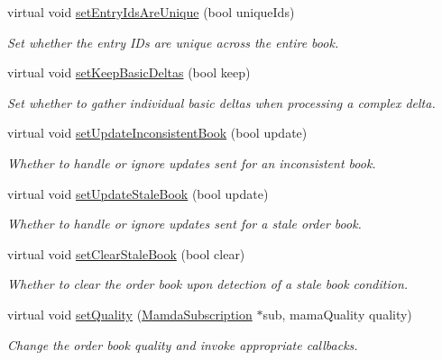 \begin{CompactItemize}
virtual void \hyperlink{classWombat_1_1MamdaOrderBookListener_4c08ce3aefa0cddb9980a7a8cf043545}{set\-Entry\-Ids\-Are\-Unique} (bool unique\-Ids)
\begin{CompactList}\small\item\em Set whether the entry IDs are unique across the entire book. \item\end{CompactList}\item 
virtual void \hyperlink{classWombat_1_1MamdaOrderBookListener_393f4acf6e9f87dc8c1de480398d2c6e}{set\-Keep\-Basic\-Deltas} (bool keep)
\begin{CompactList}\small\item\em Set whether to gather individual basic deltas when processing a complex delta. \item\end{CompactList}\item 
virtual void \hyperlink{classWombat_1_1MamdaOrderBookListener_8d9563f0639d57630d786a614da5ad60}{set\-Update\-Inconsistent\-Book} (bool update)
\begin{CompactList}\small\item\em Whether to handle or ignore updates sent for an inconsistent book. \item\end{CompactList}\item 
virtual void \hyperlink{classWombat_1_1MamdaOrderBookListener_a32964aa10c3d4f2021f55018585d4a7}{set\-Update\-Stale\-Book} (bool update)
\begin{CompactList}\small\item\em Whether to handle or ignore updates sent for a stale order book. \item\end{CompactList}\item 
virtual void \hyperlink{classWombat_1_1MamdaOrderBookListener_6dd743bb5c20544a503004f6053a1fda}{set\-Clear\-Stale\-Book} (bool clear)
\begin{CompactList}\small\item\em Whether to clear the order book upon detection of a stale book condition. \item\end{CompactList}\item 
virtual void \hyperlink{classWombat_1_1MamdaOrderBookListener_224baaa3e2a4d9d5fe5b062cf9fe1082}{set\-Quality} (\hyperlink{classWombat_1_1MamdaSubscription}{Mamda\-Subscription} $\ast$sub, mama\-Quality quality)
\begin{CompactList}\small\item\em Change the order book quality and invoke appropriate callbacks. \item\end{CompactList}\item 

\end{CompactItemize}

